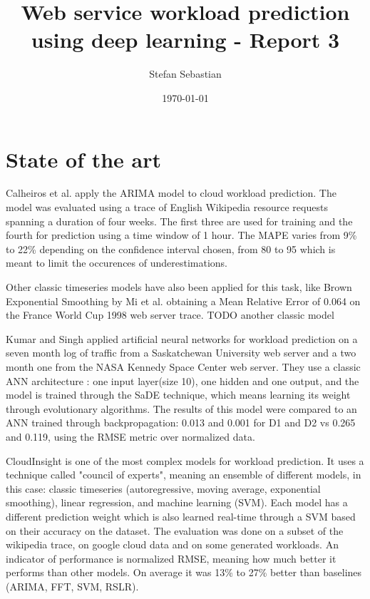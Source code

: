 \documentclass[12pt]{article}
\title{Web service workload prediction using deep learning - Report 3}
\date{\today}
\author{Stefan Sebastian}
\begin{document}
  \maketitle
  
  \newpage
  \tableofcontents
  \newpage 

  \section{State of the art}

  Calheiros et al.\cite{arima_prediction} apply the ARIMA model
  to cloud workload prediction. The model was evaluated using a trace of English Wikipedia resource requests
  spanning a duration of four weeks. The first three are used for training and the fourth for prediction 
  using a time window of 1 hour. The MAPE varies from 9\% to 22\% depending on the confidence interval chosen, 
  from 80 to 95 which is meant to limit the occurences of underestimations.

  Other classic timeseries models have also been applied for this task, like Brown Exponential 
  Smoothing by Mi et al.\cite{brown_prediction} obtaining a Mean Relative Error of 0.064 on 
  the France World Cup 1998 web server trace. TODO another classic model

  Kumar and Singh\cite{ann_prediction} applied artificial neural networks 
  for workload prediction on a seven month log of traffic from a Saskatchewan University 
  web server and a two month one from the NASA Kennedy Space Center web server. They use 
  a classic ANN architecture : one input layer(size 10), one hidden and one output, and the model 
  is trained through the SaDE technique, which means learning its weight through evolutionary algorithms.
  The results of this model were compared to an ANN trained through backpropagation: 0.013 and 0.001 for D1 and
  D2 vs 0.265 and 0.119, using the RMSE metric over normalized data.

  CloudInsight\cite{CloudInsight} is one of the most complex models for workload prediction. It uses a technique called "council 
  of experts", meaning an ensemble of different models, in this case: classic timeseries (autoregressive, moving average, exponential smoothing),
  linear regression, and machine learning (SVM). Each model has a different prediction weight which is also learned real-time through 
  a SVM based on their accuracy on the dataset. The evaluation was done on a subset of the wikipedia trace\cite{wikidata}, on google 
  cloud data and on some generated workloads. An indicator of performance is normalized RMSE, meaning how much better it performs than 
  other models. On average it was 13\% to 27\% better than baselines (ARIMA, FFT, SVM, RSLR).
  
\end{document}
